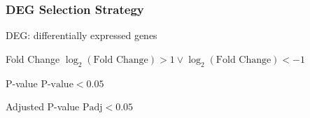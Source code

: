 \documentclass{beamer}
\begin{document}
    \begin{frame}
        \frametitle{DEG Selection Strategy}
        DEG: differentially expressed genes

        \begin{block}{Fold Change}
            $\log_{2}(\text{Fold Change}) > 1 \vee \log_{2}(\text{Fold Change}) < -1$
        \end{block}

        \begin{block}{P-value}
            $\text{P-value} < 0.05$
        \end{block}

        \begin{block}{Adjusted P-value}
            $\text{Padj} < 0.05$
        \end{block}
    \end{frame}
\end{document}

